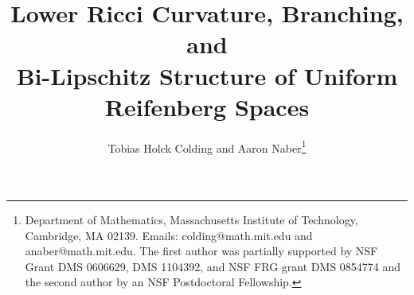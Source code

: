 \documentclass[11pt]{article}
\begin{document}
\newtheorem{theorem}{Theorem}[section]

\newtheorem{proposition}{Proposition}[section]

\newtheorem{lemma}{Lemma}[section]

\newtheorem{corollary}{Corollary}[section]

\theoremstyle{definition}
\newtheorem{definition}{Definition}[section]

\theoremstyle{remark}
\newtheorem{remark}{Remark}[section]

\theoremstyle{remark}
\newtheorem{example}{Example}[section]

\theoremstyle{remark}
\newtheorem{note}{Note}[section]

\theoremstyle{remark}
\newtheorem{question}{Question}[section]

\theoremstyle{remark}
\newtheorem{conjecture}{Conjecture}[section]

\title{Lower Ricci Curvature, Branching, \\and\\ Bi-Lipschitz Structure of Uniform Reifenberg Spaces}

\author{Tobias Holck Colding and Aaron Naber\thanks{Department of Mathematics, Massachusetts Institute of Technology, Cambridge, MA 02139.  Emails: colding@math.mit.edu and anaber@math.mit.edu.
         The  first author
was partially supported by NSF Grant DMS  0606629, DMS 1104392,  and NSF FRG grant DMS
 0854774 and the second author by an NSF Postdoctoral Fellowship.}}

\end{document}
